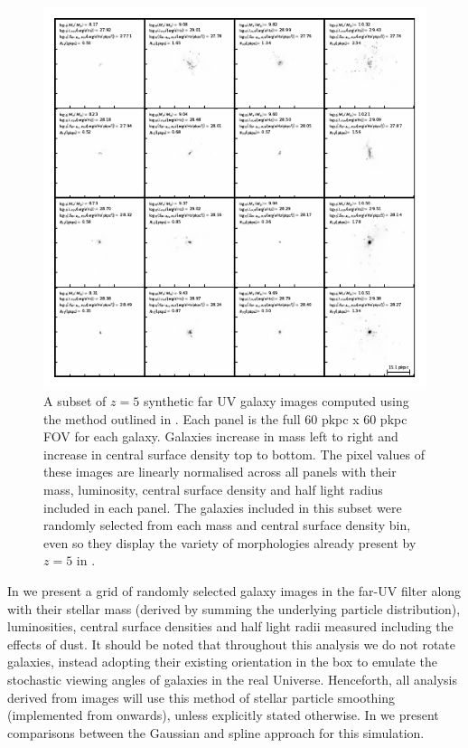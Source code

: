 \begin{figure}
	\includegraphics[width=\linewidth]{Figures/ImgGrid_FAKE.TH.FUV_5.0_14_010_z005p000_sim_Total_default.pdf}
    \caption{A subset of $z=5$ synthetic far UV galaxy images computed using the method outlined in . Each panel is the full 60 pkpc x 60 pkpc FOV for each galaxy. Galaxies increase in mass left to right and increase in central surface density top to bottom. The pixel values of these images are linearly normalised across all panels with their mass, luminosity, central surface density and half light radius included in each panel. The galaxies included in this subset were randomly selected from each mass and central surface density bin, even so they display the variety of morphologies already present by $z=5$ in \flares.}
    \label{fig:example_img}
\end{figure}

In  we present a grid of randomly selected galaxy images in the far-UV filter along with their stellar mass (derived by summing the underlying particle distribution), luminosities, central surface densities and half light radii measured including the effects of dust. It should be noted that throughout this analysis we do not rotate galaxies, instead adopting their existing orientation in the box to emulate the stochastic viewing angles of galaxies in the real Universe. Henceforth, all analysis derived from images will use this method of stellar particle smoothing (implemented from  onwards), unless explicitly stated otherwise. In  we present comparisons between the Gaussian and spline approach for this simulation. 